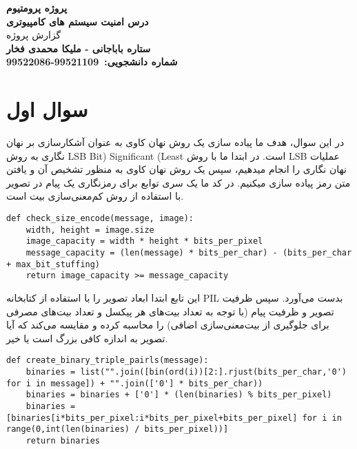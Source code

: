 \def \Subject {پروژه پرومتیوم}
\def \Course {درس امنیت سیستم های کامپیوتری}
\def \Author {ستاره باباجانی - ملیکا محمدی فخار}
\def \Report {گزارش پروژه}
\def \StudentNumber {99521109-99522086}

\begin{center}
\vspace{.4cm}
{\bf {\huge \Subject}}\\
\vspace{.3cm}
{\bf \Large \Course}\\
{\Large \Report} \\
\vspace{.2cm}
{\bf \Author }  \\
{\bf شماره دانشجویی:\ \StudentNumber}\\
\end{center}

\hspace{\fill} 



\clearpage

\section{سوال اول}
در این سوال، هدف ما پیاده سازی یک روش نهان کاوی به عنوان آشکارسازی بر نهان نگاری به روش LSB Bit) Significant (Least است. در ابتدا ما با روش LSB عملیات نهان نگاری را انجام میدهیم، سپس یک روش نهان کاوی به منظور تشخیص آن و یافتن متن رمز پیاده سازی میکنیم.
در کد ما یک سری توابع برای رمزنگاری یک پیام در تصویر با استفاده از روش کم‌معنی‌سازی‌ بیت است. 

\begin{lstlisting}[caption={Python code}]
def check_size_encode(message, image):
    width, height = image.size
    image_capacity = width * height * bits_per_pixel
    message_capacity = (len(message) * bits_per_char) - (bits_per_char + max_bit_stuffing)
    return image_capacity >= message_capacity
\end{lstlisting}

این تابع ابتدا ابعاد تصویر را با استفاده از کتابخانه PIL بدست می‌آورد. سپس ظرفیت تصویر و ظرفیت پیام (با توجه به تعداد بیت‌های هر پیکسل و تعداد بیت‌های مصرفی برای جلوگیری از بیت‌معنی‌سازی اضافی) را محاسبه کرده و مقایسه می‌کند که آیا تصویر به اندازه کافی بزرگ است یا خیر.

\begin{lstlisting}[caption={Python code}]
def create_binary_triple_pairls(message):
    binaries = list("".join([bin(ord(i))[2:].rjust(bits_per_char,'0') for i in message]) + "".join(['0'] * bits_per_char))
    binaries = binaries + ['0'] * (len(binaries) % bits_per_pixel)
    binaries = [binaries[i*bits_per_pixel:i*bits_per_pixel+bits_per_pixel] for i in range(0,int(len(binaries) / bits_per_pixel))]
    return binaries
\end{lstlisting}

